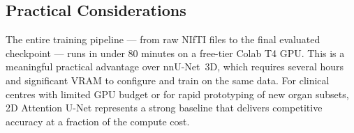 \subsection{Practical Considerations}

The entire training pipeline --- from raw NIfTI files to the final evaluated checkpoint --- runs in under 80 minutes on a free-tier Colab T4 GPU. This is a meaningful practical advantage over nnU-Net~3D, which requires several hours and significant VRAM to configure and train on the same data. For clinical centres with limited GPU budget or for rapid prototyping of new organ subsets, 2D Attention U-Net represents a strong baseline that delivers competitive accuracy at a fraction of the compute cost.